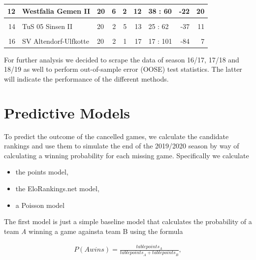 \documentclass[12pt,a4paper]{article}
\begin{document}
\begin{table}[!h]
{\begin{tabular}[t]{r|l|l|r|r|r|l|r|r}
\hline
12 & Westfalia Gemen II & 20 & 6 & 2 & 12 & 38 : 60 & -22 & 20\\
\hline
\cellcolor{gray!6}{13} & \cellcolor{gray!6}{SC Reken II} & \cellcolor{gray!6}{19} & \cellcolor{gray!6}{4} & \cellcolor{gray!6}{3} & \cellcolor{gray!6}{12} & \cellcolor{gray!6}{41 : 61} & \cellcolor{gray!6}{-20} & \cellcolor{gray!6}{15}\\
\hline
14 & TuS 05 Sinsen II & 20 & 2 & 5 & 13 & 25 : 62 & -37 & 11\\
\hline
\cellcolor{gray!6}{15} & \cellcolor{gray!6}{Adler Weseke II} & \cellcolor{gray!6}{20} & \cellcolor{gray!6}{2} & \cellcolor{gray!6}{4} & \cellcolor{gray!6}{14} & \cellcolor{gray!6}{23 : 64} & \cellcolor{gray!6}{-41} & \cellcolor{gray!6}{10}\\
\hline
16 & SV Altendorf-Ulfkotte & 20 & 2 & 1 & 17 & 17 : 101 & -84 & 7\\
\hline
\end{tabular}}
\end{table}

For further analysis we decided to scrape the data of season 16/17,
17/18 and 18/19 as well to perform out-of-sample error (OOSE) test
statistics. The latter will indicate the performance of the different
methods.

\hypertarget{predictive-models}{%
\section{Predictive Models}\label{predictive-models}}

To predict the outcome of the cancelled games, we calculate the
candidate rankings and use them to simulate the end of the 2019/2020
season by way of calculating a winning probability for each missing
game. Specifically we calculate

\begin{itemize}
\item the points model,
\item the EloRankings.net model, 
\item a Poisson model
\end{itemize}

The first model is just a simple baseline model that calculates the
probability of a team \emph{A} winning a game againsta team B using the
formula

\begin{align}
P(A wins) = \frac{table points_A}{{table points}_A + {table points}_B},
\end{align}
\end{document}
